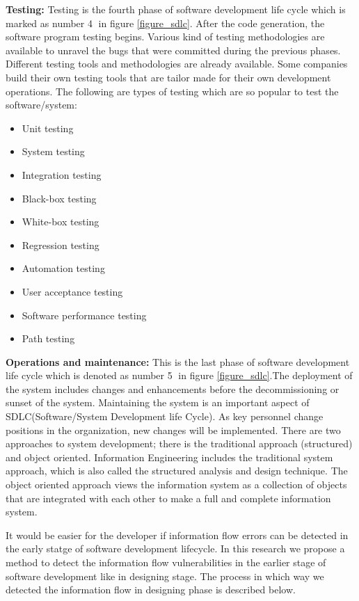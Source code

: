\textbf{Testing:}
Testing is the fourth phase of software development life cycle which is marked as number \textcircled{4} in figure \ref{figure_sdlc}. After the code generation, the software program testing begins. Various kind of testing methodologies are available to unravel the bugs that were committed during the previous phases. Different testing tools and methodologies are already available. Some companies build their own testing tools that are tailor made for their own development operations. The following are types of testing which are so popular to test the software/system:
\begin{itemize}
	\item Unit testing
    \item System testing
	\item Integration testing
	\item Black-box testing
	\item White-box testing
	\item Regression testing
	\item Automation testing
	\item User acceptance testing
	\item Software performance testing
	\item Path testing
\end{itemize}

\textbf{Operations and maintenance:}
This is the last phase of software development life cycle which is denoted as number \textcircled{5} in figure \ref{figure_sdlc}.The deployment of the system includes changes and enhancements before the decommissioning or sunset of the system. Maintaining the system is an important aspect of SDLC(Software/System Development life Cycle). As key personnel change positions in the organization, new changes will be implemented. There are two approaches to system development; there is the traditional approach (structured) and object oriented. Information Engineering includes the traditional system approach, which is also called the structured analysis and design technique. The object oriented approach views the information system as a collection of objects that are integrated with each other to make a full and complete information system.

It would be easier for the developer if information flow errors can be detected in the early statge of software development lifecycle. In this research we propose a method to detect the information flow vulnerabilities in the earlier stage of software development like in designing stage. The process in which way we detected the information flow in designing phase is described below.


